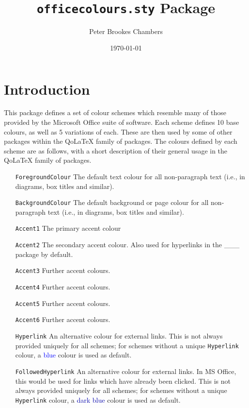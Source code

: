 \documentclass[]{article}
\title{\texttt{officecolours.sty} Package}
\author{Peter Brookes Chambers}
\date{\today{}}
\newcommand{\qo}{Qo\LaTeX}
\begin{document}
\setlength\parskip{1.5em}
\newif\ifcols
\colstrue
\setlength\columnsep{2cm}
\setlength{\columnseprule}{0.4pt}

\maketitle
\clearpage

\begin{multicols}{3}
\tableofcontents
\clearpage
\end{multicols}


  \section{Introduction}
  This package defines a set of colour schemes which resemble many of those provided by the Microsoft Office suite of software. Each scheme defines 10 base colours, as well as 5 variations of each. These are then used by some of other packages within the \qo{} family of packages. The colours defined by each scheme are as follows, with a short description of their general usage in the \qo{} family of packages.

  \begin{itemize}[leftmargin = 1.75in, labelsep = 0.75cm]
    \item [\texttt{ForegroundColour}] The default text colour for all non-paragraph text (i.e., in diagrams, box titles and similar).
    \item [\texttt{BackgroundColour}] The default background or page colour for all non-paragraph text (i.e., in diagrams, box titles and similar).
    \item [\texttt{Accent1}] The primary accent colour
    \item [\texttt{Accent2}] The secondary accent colour. Also used for hyperlinks in the \color{red}\_\_\_\normalcolor{} package by default.
    \item [\texttt{Accent3}] Further accent colours.
    \item [\texttt{Accent4}] Further accent colours.
    \item [\texttt{Accent5}] Further accent colours.
    \item [\texttt{Accent6}] Further accent colours.
    \item[\texttt{Hyperlink}] An alternative colour for external links. This is not always provided uniquely for all schemes; for schemes without a unique \texttt{Hyperlink} colour, a \textcolor[HTML]{0000FF}{blue} colour is used as default.
    \item[\texttt{FollowedHyperlink}] An alternative colour for external links. In MS Office, this would be used for links which have already been clicked. This is not always provided uniquely for all schemes; for schemes without a unique \texttt{Hyperlink} colour, a \textcolor[HTML]{0000AA}{dark blue} colour is used as default.
  \end{itemize}
\end{document}
